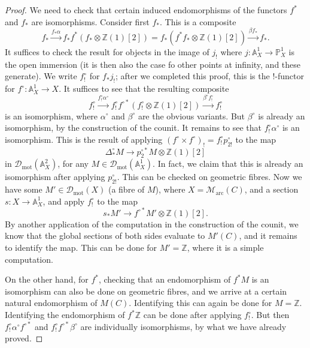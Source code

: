 \documentclass[11pt]{amsart}
\numberwithin{equation}{section}
\numberwithin{theorem}{section}
\theoremstyle{definition}
\begin{document}
\begin{proof}
We need to check that certain induced endomorphisms of the functors $f^\ast$ and $f_\ast$ are isomorphisms. Consider first $f_\ast$. This is a composite
\[
f_\ast\xrightarrow{f_\ast \alpha} f_\ast f^\ast(f_\ast\otimes\mathbb Z(1)[2]) = f_\ast(f^\ast f_\ast\otimes\mathbb Z(1)[2])\xrightarrow{\beta f_\ast} f_\ast.
\]
It suffices to check the result for objects in the image of $j_!$ where $j: \mathbb A^1_X\to \mathbb P^1_X$ is the open immersion (it is then also the case fo other points at infinity, and these generate). We write $f^\circ_!$ for $f_\ast j_!$; after we completed this proof, this is the $!$-functor for $f^\circ: \mathbb A^1_X\to X$. It suffices to see that the resulting composite
\[
f^\circ_!\xrightarrow{f^\circ_! \alpha^\circ} f^\circ_! f^{\circ\ast}(f^\circ_!\otimes \mathbb Z(1)[2])\xrightarrow{\beta^\circ f^\circ_!} f^\circ_!
\]
is an isomorphism, where $\alpha^\circ$ and $\beta^\circ$ are the obvious variants. But $\beta^\circ$ is already an isomorphism, by the construction of the counit. It remains to see that $f^\circ_! \alpha^\circ$ is an isomorphism. This is the result of applying $(f^\circ\times f^\circ)_! = f^\circ_! p_{2!}^\circ$ to the map
\[
\Delta^\circ_\ast M\to p_2^{\circ\ast} M\otimes \mathbb Z(1)[2]
\]
in $\mathcal D_{\mathrm{mot}}(\mathbb A^2_X)$, for any $M\in \mathcal D_{\mathrm{mot}}(\mathbb A^1_X)$. In fact, we claim that this is already an isomorphism after applying $p_{2!}^\circ$. This can be checked on geometric fibres. Now we have some $M'\in \mathcal D_{\mathrm{mot}}(X)$ (a fibre of $M$), where $X=\mathcal M_{\mathrm{arc}}(C)$, and a section $s: X\to \mathbb A^1_X$, and apply $f^\circ_!$ to the map
\[
s_\ast M'\to f^{\circ\ast} M'\otimes \mathbb Z(1)[2].
\]
By another application of the computation in the construction of the counit, we know that the global sections of both sides evaluate to $M'(C)$, and it remains to identify the map. This can be done for $M'=\mathbb Z$, where it is a simple computation.

On the other hand, for $f^\ast$, checking that an endomorphism of $f^\ast M$ is an isomorphism can also be done on geometric fibres, and we arrive at a certain natural endomorphism of $M(C)$. Identifying this can again be done for $M=\mathbb Z$. Identifying the endomorphism of $f^\ast \mathbb Z$ can be done after applying $f^\circ_!$. But then $f^\circ_! \alpha^\circ f^{\circ\ast}$ and $f^\circ_! f^{\circ\ast} \beta^\circ$ are individually isomorphisms, by what we have already proved.
\end{proof}
\end{document}
